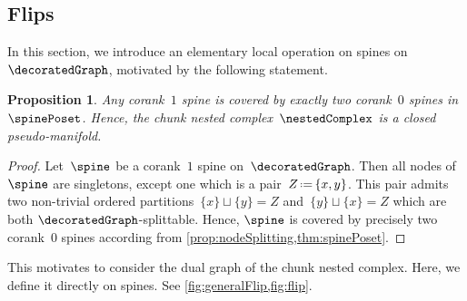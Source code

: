 \documentclass{amsart}
\newtheorem{proposition}[theorem]{Proposition}
\theoremstyle{definition}
\newcommand{\eqdef}{\mbox{\,\raisebox{0.2ex}{\scriptsize\ensuremath{\mathrm:}}\ensuremath{=}\,}} %
\begin{document}

\subsection{Flips}
\label{subsec:flips}

In this section, we introduce an elementary local operation on spines on~$\decoratedGraph$, motivated by the following statement.

\begin{proposition}
  \label{prop:pseudomanifold}
  Any corank~$1$ spine is covered by exactly two corank~$0$ spines in~$\spinePoset$.
  Hence, the chunk nested complex~$\nestedComplex$ is a closed pseudo-manifold.
\end{proposition}

\begin{proof}
  Let~$\spine$ be a corank~$1$ spine on~$\decoratedGraph$.
  Then all nodes of~$\spine$ are singletons, except one which is a pair~$Z \eqdef \{x,y\}$.
  This pair admits two non-trivial ordered partitions~${\{x\} \sqcup \{y\} = Z}$ and~${\{y\} \sqcup \{x\} = Z}$ which are both $\decoratedGraph$-splittable.
  Hence, $\spine$ is covered by precisely two corank~$0$ spines according from \cref{prop:nodeSplitting,thm:spinePoset}.
\end{proof}

This motivates to consider the dual graph of the chunk nested complex.
Here, we define it directly on spines.
See \cref{fig:generalFlip,fig:flip}.
\end{document}
